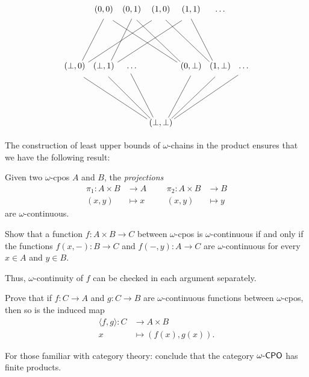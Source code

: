 \begin{example}
  \[
    \begin{tikzcd}[column sep=1pt, row sep=50pt]
      & (0,0) & (0,1) & (1,0) & (1,1) & \dots \\
      (\bot,0) \ar[ur, no head, shift right=5pt]
      \ar[urrr, no head, shift right=5pt]
      & (\bot,1)
      \ar[ur, no head, shift right=5pt]
      \ar[urrr, no head, shift right=5pt]
      & \dots
      &
      & (0,\bot)
      \ar[ulll, no head, shift left=5pt]
      \ar[ull, no head, shift left=5pt]
      & (1,\bot)
      \ar[ull, no head, shift left=5pt]
      \ar[ul, no head, shift left=5pt]
      & \dots \\
      & & & (\bot,\bot)
      \ar[ulll,no head, shift left=5pt] \ar[ull, no head, shift left=5pt]
      \ar[ul, no head, shift left=5pt] \ar[ur, no head, shift right=5pt]
      \ar[urr, no head, shift right=5pt] \ar[urrr, no head, shift right=5pt]
    \end{tikzcd}
  \]
\end{example}

The construction of least upper bounds of \(\omega\)-chains in the product
ensures that we have the following result:
\begin{lemma}\label{projections}
  Given two \(\omega\)-cpos \(A\) and \(B\), the \emph{projections}
  \begin{align*}
    \pi_1 \colon A \times B &\to A &&& \pi_2 \colon A \times B &\to B \\
    (x,y) &\mapsto x &&& (x,y) &\mapsto y
  \end{align*}
  are \(\omega\)-continuous.
\end{lemma}

\begin{exercise}\label{exer:continuity-in-each-argument}
  Show that a function \(f \colon A \times B \to C\) between \(\omega\)-cpos is
  \(\omega\)-continuous if and only if the functions \(f(x,-) \colon B \to C\) and
  \(f(-,y) \colon A \to C\) are \(\omega\)-continuous for every \(x \in A\) and
  \(y \in B\).

  Thus, \(\omega\)-continuity of \(f\) can be checked in each argument
  separately.
\end{exercise}

\begin{exercise}\label{exer:product-induced}
  Prove that if \(f \colon C \to A\) and \(g \colon C \to B\) are
  \(\omega\)-continuous functions between \(\omega\)-cpos, then so is the
  induced map
  \begin{align*}
    \langle f , g \rangle  \colon C &\to A \times B \\
    x &\mapsto (f(x),g(x)).
  \end{align*}

  For those familiar with category theory: conclude that the category
  \(\omegaCPO\) has finite products.
\end{exercise}

